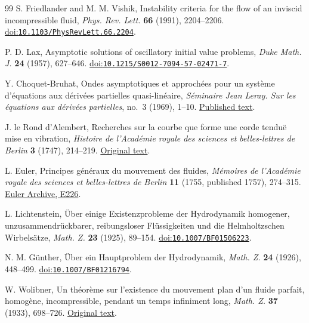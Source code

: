 \begin{thebibliography}{99}
 S. Friedlander and M. M. Vishik,
Instability criteria for the flow of an inviscid incompressible fluid,
\emph{Phys. Rev. Lett.} \textbf{66} (1991), 2204--2206.
\href{https://doi.org/10.1103/PhysRevLett.66.2204}{doi:\nolinkurl{10.1103/PhysRevLett.66.2204}}.

 P. D. Lax,
Asymptotic solutions of oscillatory initial value problems,
\emph{Duke Math. J.} \textbf{24} (1957), 627--646.
\href{https://doi.org/10.1215/S0012-7094-57-02471-7}{doi:\nolinkurl{10.1215/S0012-7094-57-02471-7}}.

 Y. Choquet-Bruhat,
Ondes asymptotiques et approch\'ees pour un syst\`eme d'\'equations
aux d\'eriv\'ees partielles quasi-lin\'eaire,
\emph{S\'eminaire Jean Leray. Sur les \'equations aux d\'eriv\'ees partielles},
no.~3 (1969), 1--10.
\href{https://numdam.org/item/SJL_1969___3_1_0/}{Published text}.

 J. le Rond d'Alembert,
Recherches sur la courbe que forme une corde tendu\"e mise en vibration,
\emph{Histoire de l'Acad\'emie royale des sciences et belles-lettres de Berlin}
\textbf{3} (1747), 214--219.
\href{https://webusers.imj-prg.fr/~david.aubin/cours/Textes/Dalembert-HAB-1747-cordes-vibrantes.pdf}{Original text}.

 L. Euler,
Principes g\'en\'eraux du mouvement des fluides,
\emph{M\'emoires de l'Acad\'emie royale des sciences et belles-lettres de Berlin}
\textbf{11} (1755, published 1757), 274--315.
\href{https://scholarlycommons.pacific.edu/euler-works/226/}{Euler Archive, E226}.

 L. Lichtenstein,
\"Uber einige Existenzprobleme der Hydrodynamik homogener,
unzusammendr\"uckbarer, reibungsloser Fl\"ussigkeiten und die Helmholtzschen
Wirbels\"atze, \emph{Math. Z.} \textbf{23} (1925), 89--154.
\href{https://doi.org/10.1007/BF01506223}{doi:\nolinkurl{10.1007/BF01506223}}.

 N. M. G\"unther,
\"Uber ein Hauptproblem der Hydrodynamik,
\emph{Math. Z.} \textbf{24} (1926), 448--499.
\href{https://doi.org/10.1007/BF01216794}{doi:\nolinkurl{10.1007/BF01216794}}.

 W. Wolibner,
Un th\'eor\`eme sur l'existence du mouvement plan d'un fluide parfait,
homog\`ene, incompressible, pendant un temps infiniment long,
\emph{Math. Z.} \textbf{37} (1933), 698--726.
\href{https://gdz.sub.uni-goettingen.de/id/PPN266833020_0037?tify=%7B%22pages%22%3A%5B702%5D%7D}{Original text}.


\end{thebibliography}
